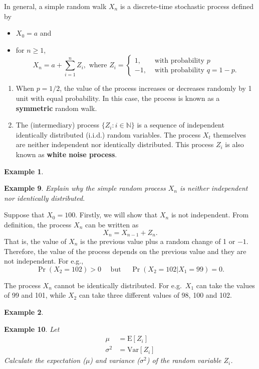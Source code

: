 \documentclass[
]{book}
\theoremstyle{definition}
\theoremstyle{definition}
\newtheorem{example}{Example}[chapter]
\theoremstyle{definition}
\theoremstyle{definition}
\theoremstyle{remark}
\begin{document}
In general, a simple random walk \(X_n\) is a discrete-time stochastic
process defined by

\begin{itemize}
\item
  \(X_0 = a\) and
\item
  for \(n \ge1\),
  \[X_n = a + \sum_{i=1}^n  Z_i, \text{ where } Z_i = \begin{cases}
      1, & \text{ with probability } p  \\
      -1, & \text{ with probability } q =  1- p.
   \end{cases}\]
\end{itemize}

\begin{enumerate}
\def\labelenumi{\arabic{enumi}.}
\item
  When \(p = 1/2\), the value of the process increases or decreases
  randomly by 1 unit with equal probability. In this case, the process
  is known as a \textbf{symmetric} random walk.
\item
  The (intermediary) process \(\{ Z_i : i \in \mathbb{N}\}\) is a
  sequence of independent identically distributed (i.i.d.) random
  variables. The process \(X_t\) themselves are neither independent nor
  identically distributed. This process \(Z_i\) is also known as \textbf{white
  noise process}.
\end{enumerate}

\begin{example}
\protect\hypertarget{exm:unlabeled-div-9}{}\label{exm:unlabeled-div-9}

\textbf{Example 9}. \emph{Explain why the simple random process \(X_n\) is neither
independent nor identically distributed.}

\end{example}

Suppose that \(X_0 = 100\). Firstly, we will show that \(X_n\) is not
independent. From definition, the process \(X_n\) can be written as
\[X_n = X_{n-1} + Z_n.\] That is, the value of \(X_n\) is the previous
value plus a random change of 1 or \(-1\). Therefore, the value of the
process depends on the previous value and they are not independent. For
e.g.,
\[\Pr(X_2 = 102) > 0 \quad \text{ but } \quad  \Pr(X_2 = 102 | X_1 = 99) = 0.\]

The process \(X_n\) cannot be identically distributed. For e.g.~\(X_1\) can
take the values of 99 and 101, while \(X_2\) can take three different
values of 98, 100 and 102.

\begin{example}
\protect\hypertarget{exm:unlabeled-div-10}{}\label{exm:unlabeled-div-10}

\textbf{Example 10}. \emph{Let \[\begin{aligned}
    \mu &= \mathrm{E}[Z_i] \\
    \sigma^2 &= \mathrm{Var}[Z_i] \end{aligned}\] Calculate the
expectation (\(\mu\)) and variance (\(\sigma^2\)) of the random variable
\(Z_i\).}

\end{example}
\end{document}

